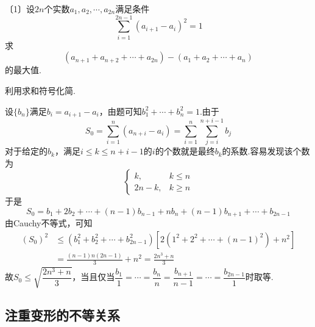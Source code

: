 \documentclass[lang=cn, zihao=4.5]{elegantbook}
\newcommand{\nd}[1]{〔#1〕}
\begin{document}
\begin{example} %
	\nd{1}设$2n$个实数$a_1,a_2, \cdots ,a_{2n}$满足条件$$\sum_{i=1}^{2n-1} (a_{i+1}-a_i)^2 = 1$$
	求$$(a_{n+1} + a_{n+2} + \cdots + a_{2n}) - (a_{1} + a_{2} + \cdots + a_{n})$$的最大值.
\end{example}
\begin{hint}
	利用求和符号化简.
\end{hint}
\begin{solution}
	设$\{ b_n \}$满足$b_i = a_{i+1} - a_i$，由题可知$b_1^2 + \cdots + b_n^2 = 1$.由于$$S_0 = \sum_{i=1}^{n} (a_{n+i} - a_i) = \sum_{i=1}^{n} \sum_{j=i}^{n+i-1} b_j$$
	对于给定的$b_k$，满足$i \leq k \leq n+i-1$的$i$的个数就是最终$b_k$的系数.容易发现该个数为$$
	\begin{cases}
		k, \quad &k \leq n \\
		2n-k, & k \geq n
	\end{cases}$$
	于是$$S_0 = b_1+2b_2 + \cdots + (n-1)b_{n-1} + nb_n + (n-1)b_{n+1} + \cdots + b_{2n-1}$$
	由Cauchy不等式，可知
	\begin{align*}
		(S_0)^2 &\leq (b_1^2+b_2^2 + \cdots + b_{2n-1}^2)[2(1^2+2^2 + \cdots + (n-1)^2)+n^2] \\
		&= \frac{(n-1)n(2n-1)}{3} + n^2 = \frac{2n^3+n}{3}
	\end{align*}
	故$S_0 \leq \sqrt{\dfrac{2n^3+n}{3}}$，当且仅当$\dfrac{b_1}{1} = \cdots = \dfrac{b_n}{n} = \dfrac{b_{n+1}}{n-1} = \cdots = \dfrac{b_{2n-1}}{1}$时取等.
\end{solution}

\subsection{注重变形的不等关系}
\end{document}
